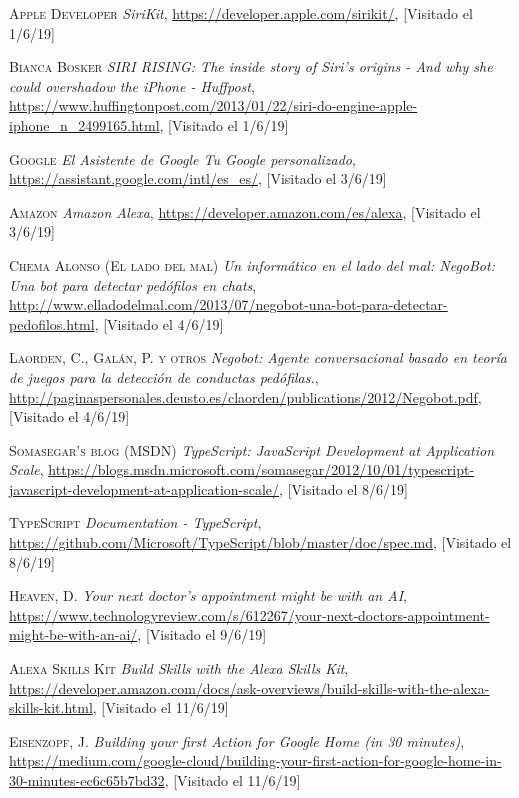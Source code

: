 \documentclass[spanish,12pt, a4paper, twoside]{paper}
\begin{document}
\begin{thebibliography}{00}
 \textsc{Apple Developer} \textit{SiriKit}, \url{https://developer.apple.com/sirikit/}, [Visitado el 1/6/19]

 \textsc{Bianca Bosker} \textit{SIRI RISING: The inside story of Siri's origins - And why she could overshadow the iPhone - Huffpost}, \url{https://www.huffingtonpost.com/2013/01/22/siri-do-engine-apple-iphone_n_2499165.html}, [Visitado el 1/6/19]

 \textsc{Google} \textit{El Asistente de Google \textbar Tu Google personalizado}, \url{https://assistant.google.com/intl/es_es/}, [Visitado el 3/6/19]

 \textsc{Amazon} \textit{Amazon Alexa}, \url{https://developer.amazon.com/es/alexa}, [Visitado el 3/6/19]

 \textsc{Chema Alonso (El lado del mal)} \textit{Un informático en el lado del mal: NegoBot: Una bot para detectar pedófilos en chats}, \url{http://www.elladodelmal.com/2013/07/negobot-una-bot-para-detectar-pedofilos.html}, [Visitado el 4/6/19]

 \textsc{Laorden, C., Galán, P. y otros} \textit{Negobot: Agente conversacional basado en teoría de juegos para la detección de conductas pedófilas.}, \url{http://paginaspersonales.deusto.es/claorden/publications/2012/Negobot.pdf}, [Visitado el 4/6/19]

 \textsc{Somasegar's blog (MSDN)} \textit{TypeScript: JavaScript Development at Application Scale}, \url{https://blogs.msdn.microsoft.com/somasegar/2012/10/01/typescript-javascript-development-at-application-scale/}, [Visitado el 8/6/19]

 \textsc{TypeScript} \textit{Documentation - TypeScript}, \url{https://github.com/Microsoft/TypeScript/blob/master/doc/spec.md}, [Visitado el 8/6/19]

 \textsc{Heaven, D.} \textit{Your next doctor's appointment might be with an AI}, \url{https://www.technologyreview.com/s/612267/your-next-doctors-appointment-might-be-with-an-ai/}, [Visitado el 9/6/19]

 \textsc{Alexa Skills Kit} \textit{Build Skills with the Alexa Skills Kit}, \url{https://developer.amazon.com/docs/ask-overviews/build-skills-with-the-alexa-skills-kit.html}, [Visitado el 11/6/19]

 \textsc{Eisenzopf, J.} \textit{Building your first Action for Google Home (in 30 minutes)}, \url{https://medium.com/google-cloud/building-your-first-action-for-google-home-in-30-minutes-ec6c65b7bd32}, [Visitado el 11/6/19]


\end{thebibliography}
\end{document}
